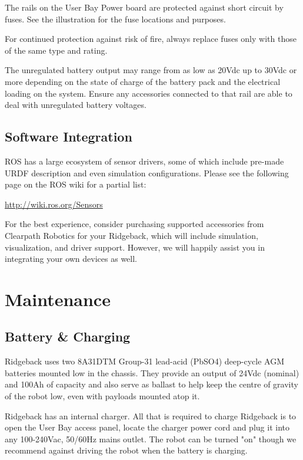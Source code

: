 \documentclass[]{clearpath-latex/clearpath-manual}
\begin{document}
The rails on the User Bay Power board are protected against short circuit by fuses. See the illustration for the fuse locations and purposes.

\begin{warning}
For continued protection against risk of fire, always replace fuses only with those of the same type and rating.
\end{warning}

\begin{warning}
The unregulated battery output may range from as low as 20Vdc up to 30Vdc or more depending on the state of charge of the battery pack and the electrical loading on the system. Ensure any accessories connected to that rail are able to deal with unregulated battery voltages.
\end{warning}


\subsection{Software Integration}

ROS has a large ecosystem of sensor drivers, some of which include pre-made URDF description and even simulation configurations.  Please see the following page on the ROS wiki for a partial list:

\url{http://wiki.ros.org/Sensors}

For the best experience, consider purchasing supported accessories from Clearpath Robotics for your Ridgeback, which will include simulation, visualization, and driver support.  However, we will happily assist you in integrating your own devices as well.

\section{Maintenance}

\subsection{Battery \& Charging}

Ridgeback uses two 8A31DTM Group-31 lead-acid (PbSO4) deep-cycle AGM batteries mounted low in the chassis. They provide an output of 24Vdc (nominal) and 100Ah of capacity and also serve as ballast to help keep the centre of gravity of the robot low, even with payloads mounted atop it.

Ridgeback has an internal charger. All that is required to charge Ridgeback is to open the User Bay access panel, locate the charger power cord and plug it into any 100-240Vac, 50/60Hz mains outlet. The robot can be turned "on" though we recommend against driving the robot when the battery is charging.
\end{document}
